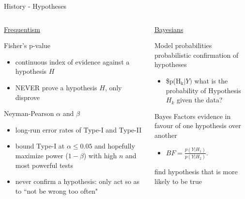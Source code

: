 \documentclass[presentation,9pt,xcolor=dvipsnames]{beamer}
\begin{document}
\begin{frame}[label={sec:org08bbeb7}]{History - Hypotheses}
\begin{columns}
\begin{column}{0.55\columnwidth}
\begin{block}{\uline{Frequentism}}
\begin{block}{Fisher's p-value}
\begin{itemize}
\item continuous index of evidence \alert{against} a hypothesis \(H\)
\item \alert{NEVER} prove a hypothesis \(H\), only disprove
\end{itemize}
\end{block}
\begin{block}{Neyman-Pearson \(\alpha\) and \(\beta\)}
\begin{itemize}
\item long-run error rates of Type-I and Type-II
\item \alert{bound} Type-I at \(\alpha\leq0.05\) and hopefully maximize power (\(1-\beta\)) with high \(n\) and most powerful tests
\item never confirm a hypothesis: only \alert{act} so as to ``not be wrong too often"
\end{itemize}
\end{block}
\end{block}
\end{column}
\begin{column}{0.45\columnwidth}
\begin{block}{\uline{Bayesians}}
\begin{block}{Model probabilities}
probabilistic confirmation of hypotheses
\begin{itemize}
\item \$p(H\(_{\text{k}} \vert Y)\) what is the probability of Hypothesis \(H_k\) given the data?
\end{itemize}
\end{block}
\begin{block}{Bayes Factors}
evidence in favour of one hypothesis over another
\begin{itemize}
\item \(BF=\frac{p(Y\vert H_1)}{p(Y\vert H_2)}\).
\end{itemize}
find hypothesis that is more likely to be true
\end{block}
\end{block}
\end{column}
\end{columns}
\end{frame}
\end{document}
